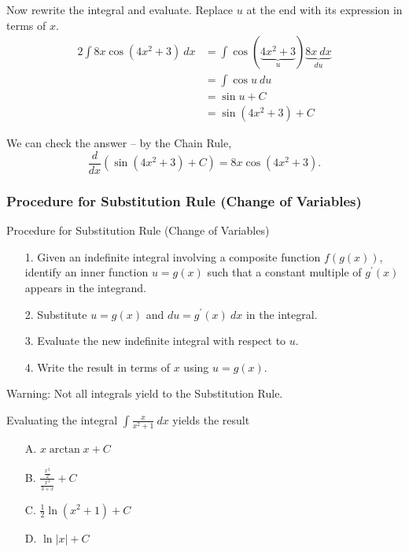 \documentclass[cal1spr16Lectures.tex]{subfiles}
\begin{document}
\begin{frame}{}\footnotesize
Now rewrite the integral and evaluate.  Replace $u$ at the end with its expression in terms of $x$. 
\begin{alignat*}{2}
\int 8x \cos(4x^2 + 3)\ dx &= \int \cos(\underbrace{4x^2 + 3}_{u})\underbrace{8x\ dx}_{du} \\
&= \int \cos u\ du \\[0.25pc]
&= \sin u + C \\[0.5pc]
&= \sin(4x^2 + 3) + C
\end{alignat*}

We can check the answer -- by the Chain Rule,
\[\frac{d}{dx}\left(\sin{(4x^2+3)}+C\right)=8x\cos{(4x^2+3)}.\]
\end{frame}

\subsubsection{Procedure for Substitution Rule (Change of Variables)}

\begin{frame}{\small Procedure for Substitution Rule (Change of Variables)}
\small
\begin{itemize}
\item[1.] Given an indefinite integral involving a composite function $f(g(x))$, identify an inner function $u=g(x)$ such that a constant multiple of $g^{\prime}(x)$ appears in the integrand.
\item[2.] Substitute $u=g(x)$ and $du=g^{\prime}(x)\ dx$ in the integral.
\item[3.] Evaluate the new indefinite integral with respect to $u$.
\item[4.] Write the result in terms of $x$ using $u=g(x)$.
\end{itemize}

\vspace{1pc}
\alert{Warning:  Not all integrals yield to the Substitution Rule.}
\end{frame}

\begin{frame}
\begin{ex}
Evaluating the integral $\int\frac{x}{x^2+1}\ dx$ yields the result
\begin{itemize}
\item[A.] $x\arctan x+C$
\item[B.] $\frac{\frac{x^2}{2}}{\frac{x^3}{3+x}}+C$
\item[C.] $\frac{1}{2}\ln{(x^2+1)}+C$
\item[D.] $\ln{|x|}+C$
\end{itemize}
\end{ex}
\end{frame}
\end{document}
